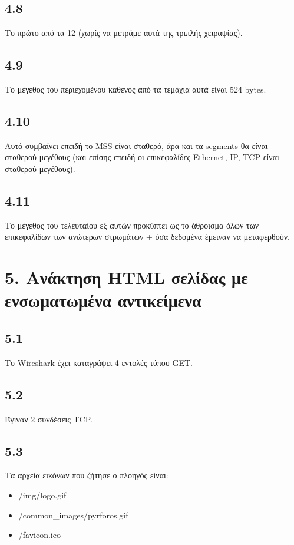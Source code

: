 		\subsection*{4.8}
			Το πρώτο από τα 12 (χωρίς να μετράμε αυτά της τριπλής χειραψίας).

		\subsection*{4.9}
			Το μέγεθος του περιεχομένου καθενός από τα τεμάχια αυτά είναι 524 bytes.

		\subsection*{4.10}
			Αυτό συμβαίνει επειδή το MSS είναι σταθερό, άρα και τα segments θα είναι σταθερού μεγέθους (και επίσης επειδή οι επικεφαλίδες Ethernet, IP, TCP είναι σταθερού μεγέθους).

		\subsection*{4.11}
			Το μέγεθος του τελευταίου εξ αυτών προκύπτει ως το άθροισμα όλων των επικεφαλίδων των ανώτερων στρωμάτων + όσα δεδομένα έμειναν να μεταφερθούν. 
		
	\section*{5. Ανάκτηση HTML σελίδας με ενσωματωμένα αντικείμενα}

		\subsection*{5.1}
			Το Wireshark έχει καταγράψει 4 εντολές τύπου GET.

		\subsection*{5.2}
			Έγιναν 2 συνδέσεις TCP.

		\subsection*{5.3}
			Τα αρχεία εικόνων που ζήτησε ο πλοηγός είναι:
			
			\begin{itemize}
				\item /img/logo.gif
				\item /common\_images/pyrforos.gif
				\item /favicon.ico
			\end{itemize}


